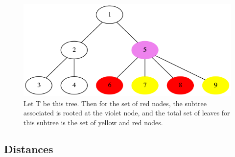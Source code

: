 \documentclass{report}
\begin{document}
\begin{figure}[H]
\centering
\includegraphics[scale=0.3]{illustrations/timili.png}
\caption{Let T be this tree. Then for the set of red nodes, the subtree associated is rooted at the violet node, and the total set of leaves for this subtree is the set of yellow and red nodes.}
\end{figure}

\subsection{Distances}
\end{document}
